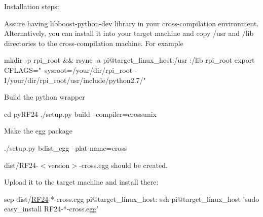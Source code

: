 Installation steps\+:
\begin{DoxyEnumerate}
\item Assure having libboost-\/python-\/dev library in your cross-\/compilation environment. Alternatively, you can install it into your target machine and copy /usr and /lib directories to the cross-\/compilation machine. For example 
\begin{DoxyCode}
mkdir -p rpi\_root && rsync -a pi@target\_linux\_host:/usr :/lib rpi\_root
export CFLAGS=\textcolor{stringliteral}{"--sysroot=/your/dir/rpi\_root -I/your/dir/rpi\_root/usr/include/python2.7/"}
\end{DoxyCode}

\item Build the python wrapper 
\begin{DoxyCode}
cd pyRF24
./setup.py build --compiler=crossunix
\end{DoxyCode}

\item Make the egg package 
\begin{DoxyCode}
./setup.py bdist\_egg --plat-name=cross 
\end{DoxyCode}
 dist/\+R\+F24-\/$<$version$>$-\/cross.\+egg should be created.
\item Upload it to the target machine and install there\+: 
\begin{DoxyCode}
scp dist/\hyperlink{classRF24}{RF24}-*-cross.egg pi@target\_linux\_host:
ssh pi@target\_linux\_host \textcolor{stringliteral}{'sudo easy\_install RF24-*-cross.egg'}
\end{DoxyCode}

\end{DoxyEnumerate}

~\newline
~\newline
~\newline
 